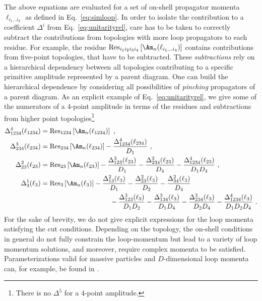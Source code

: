 The above equations are evaluated for a set of on-shell propagator momenta
$\ell_{i_1\dots i_k}$ as defined
in Eq.~\eqref{eq:simloop}. In order to isolate the contribution to a
coefficient $\Delta^i$ from Eq.~\eqref{eq:unitarityrel}, care has to be taken to correctly subtract the
contributions from topologies with more loop propagators to each
residue. For example, the residue $\text{Res}_{i_1i_2i_3i_4}\left[\Am_n(\ell_{i_1\dots i_4})\right]$ contains contributions from five-point topologies, that have to be
subtracted. These \textit{subtractions} rely on a hierarchical
dependency between all topologies contributing to a specific primitive
amplitude represented by a parent diagram. One can build the hierarchical
dependence by considering all possibilities of
\textit{pinching} propagators of a parent diagram. As an explicit
example of Eq.~\eqref{eq:unitarityrel}, we give some of the numerators of a $4$-point amplitude in
terms of the residues and subtractions from higher point
topologies\footnote{There is no $\Delta^5$ for a $4$-point amplitude.}
\begin{align}
\begin{split}
   \Delta_{1234}^4(\ell_{1234}) &=
  \text{Res}_{1234}\left[\Am_n(\ell_{1234})\right]\ ,\\
   \Delta_{234}^3(\ell_{234}) &=
  \text{Res}_{234}\left[\Am_n(\ell_{234})\right]-\frac{\Delta_{1234}^4(\ell_{234})}{D_1}\
  ,\\
\Delta_{23}^2(\ell_{23}) &=
  \text{Res}_{23}\left[\Am_n(\ell_{23})\right]-\frac{\Delta_{123}^3(\ell_{23})}{D_1}-\frac{\Delta_{234}^3(\ell_{23})}{D_4}-\frac{\Delta_{1234}^4(\ell_{23})}{D_1D_4}\
  ,\\
   \Delta_{3}^1(\ell_{3}) &=\text{Res}_{3}\left[\Am_n(\ell_{3})\right]-\frac{\Delta_{13}^2(\ell_{3})}{D_1}-\frac{\Delta_{23}^2(\ell_{3})}{D_2}-\frac{\Delta_{34}^2(\ell_{3})}{D_4}\\
&\hspace{3.6cm}-\frac{\Delta_{123}^3(\ell_{3})}{D_1D_2}-\frac{\Delta_{134}^3(\ell_{3})}{D_1D_4}-\frac{\Delta_{234}^3(\ell_{3})}{D_2D_4}-\frac{\Delta_{1234}^4(\ell_{3})}{D_1D_2D_4}\
.
\end{split}
\end{align}
For the sake of brevity, we do not give
explicit expressions for the loop momenta satisfying the cut
conditions. Depending on
the topology, the on-shell conditions in general do not fully
constrain the loop-momentum but lead to a variety of loop momentum
solutions, and moreover, require complex momenta to be satisfied. Parameterizations valid for massive particles and $D$-dimensional loop momenta can, for
example, be found in \cite{Kilgore2007,Giele:2008ve,Ita:2011hi}.


